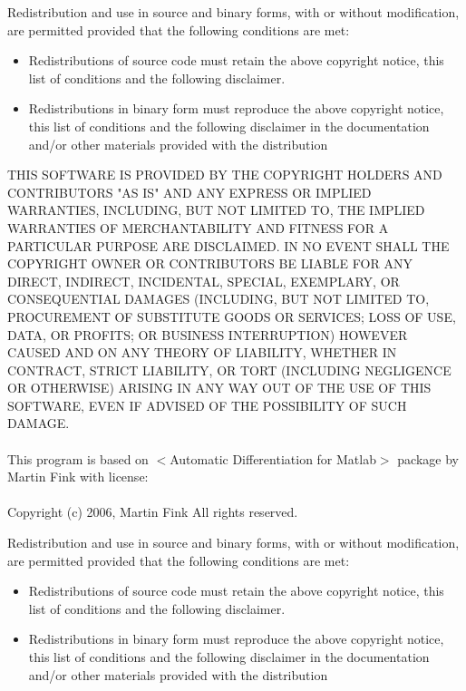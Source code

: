 \documentclass{amsart}
\begin{document}
Redistribution and use in source and binary forms, with or without modification, are permitted provided that the following conditions are met:
\begin{itemize}
  \item Redistributions of source code must retain the above copyright notice, this list of conditions and the following disclaimer.
  \item Redistributions in binary form must reproduce the above copyright notice, this list of conditions and the following disclaimer in the documentation and/or other materials provided with the distribution
\end{itemize}
THIS SOFTWARE IS PROVIDED BY THE COPYRIGHT HOLDERS AND CONTRIBUTORS "AS IS" AND ANY EXPRESS OR IMPLIED WARRANTIES, INCLUDING, BUT NOT LIMITED TO, THE IMPLIED WARRANTIES OF MERCHANTABILITY AND FITNESS FOR A PARTICULAR PURPOSE ARE DISCLAIMED. IN NO EVENT SHALL THE COPYRIGHT OWNER OR CONTRIBUTORS BE LIABLE FOR ANY DIRECT, INDIRECT, INCIDENTAL, SPECIAL, EXEMPLARY, OR CONSEQUENTIAL DAMAGES (INCLUDING, BUT NOT LIMITED TO, PROCUREMENT OF SUBSTITUTE GOODS OR SERVICES; LOSS OF USE, DATA, OR PROFITS; OR BUSINESS INTERRUPTION) HOWEVER CAUSED AND ON ANY THEORY OF LIABILITY, WHETHER IN CONTRACT, STRICT LIABILITY, OR TORT (INCLUDING NEGLIGENCE OR OTHERWISE) ARISING IN ANY WAY OUT OF THE USE OF THIS SOFTWARE, EVEN IF ADVISED OF THE POSSIBILITY OF SUCH DAMAGE.\\
\\

This program is based on $<$Automatic Differentiation for Matlab$>$ package by Martin Fink with license:\\
\\


Copyright (c) 2006, Martin Fink
All rights reserved.

Redistribution and use in source and binary forms, with or without modification, are permitted provided that the following conditions are met:
\begin{itemize}
 \item Redistributions of source code must retain the above copyright notice, this list of conditions and the following disclaimer.
 \item Redistributions in binary form must reproduce the above copyright notice, this list of conditions and the following disclaimer in the documentation and/or other materials provided with the distribution
\end{itemize}
\end{document}
